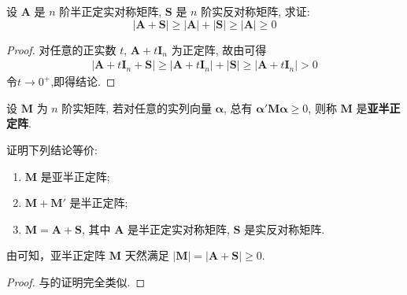 \documentclass[../../main.tex]{subfiles}
\begin{document}
\begin{proposition}\label{proposition:半正定阵的行列式的相关的不等式}
设 \(\boldsymbol{A}\) 是 \(n\) 阶半正定实对称矩阵, \(\boldsymbol{S}\) 是 \(n\) 阶实反对称矩阵, 求证:
\[|\boldsymbol{A}+\boldsymbol{S}|\geqslant |\boldsymbol{A}|+|\boldsymbol{S}|\geqslant |\boldsymbol{A}|\geqslant 0\]
\end{proposition}
\begin{proof}
对任意的正实数 \(t\), \(\boldsymbol{A}+t\boldsymbol{I}_n\) 为正定阵, 故由可得
\begin{align*}
|\boldsymbol{A}+t\boldsymbol{I}_n+\boldsymbol{S}|\geqslant |\boldsymbol{A}+t\boldsymbol{I}_n|+|\boldsymbol{S}|\geqslant |\boldsymbol{A}+t\boldsymbol{I}_n|>0
\end{align*}
令\(t\to0^+\),即得结论.
\end{proof}

\begin{definition}[亚半正定]
设 \(\boldsymbol{M}\) 为 \(n\) 阶实矩阵, 若对任意的实列向量 \(\boldsymbol{\alpha}\), 总有 \(\boldsymbol{\alpha}'\boldsymbol{M}\boldsymbol{\alpha}\geqslant 0\), 则称 \(\boldsymbol{M}\) 是\textbf{亚半正定阵}. 
\end{definition}

\begin{theorem}\label{theorem:亚半正定阵的等价条件}
证明下列结论等价:
\begin{enumerate}[(1)]
\item \(\boldsymbol{M}\) 是亚半正定阵;
\item \(\boldsymbol{M}+\boldsymbol{M}'\) 是半正定阵;
\item \(\boldsymbol{M}=\boldsymbol{A}+\boldsymbol{S}\), 其中 \(\boldsymbol{A}\) 是半正定实对称矩阵, \(\boldsymbol{S}\) 是实反对称矩阵.
\end{enumerate} 
\end{theorem}
\begin{remark}
由可知，亚半正定阵 \(\boldsymbol{M}\) 天然满足 \(|\boldsymbol{M}| = |\boldsymbol{A}+\boldsymbol{S}|\geqslant 0\).
\end{remark}
\begin{proof}
与的证明完全类似.
\end{proof}
\end{document}
